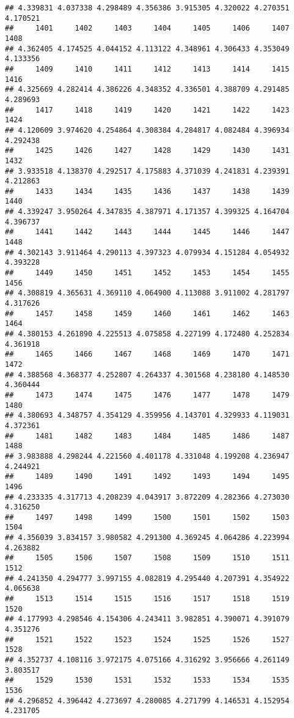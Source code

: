 \documentclass[
]{article}
\begin{document}
\begin{verbatim}
## 4.339831 4.037338 4.298489 4.356386 3.915305 4.320022 4.270351 4.170521 
##     1401     1402     1403     1404     1405     1406     1407     1408 
## 4.362405 4.174525 4.044152 4.113122 4.348961 4.306433 4.353049 4.133356 
##     1409     1410     1411     1412     1413     1414     1415     1416 
## 4.325669 4.282414 4.386226 4.348352 4.336501 4.388709 4.291485 4.289693 
##     1417     1418     1419     1420     1421     1422     1423     1424 
## 4.120609 3.974620 4.254864 4.308384 4.284817 4.082484 4.396934 4.292438 
##     1425     1426     1427     1428     1429     1430     1431     1432 
## 3.933518 4.138370 4.292517 4.175883 4.371039 4.241831 4.239391 4.212863 
##     1433     1434     1435     1436     1437     1438     1439     1440 
## 4.339247 3.950264 4.347835 4.387971 4.171357 4.399325 4.164704 4.396737 
##     1441     1442     1443     1444     1445     1446     1447     1448 
## 4.302143 3.911464 4.290113 4.397323 4.079934 4.151284 4.054932 4.393228 
##     1449     1450     1451     1452     1453     1454     1455     1456 
## 4.308819 4.365631 4.369110 4.064900 4.113088 3.911002 4.281797 4.317626 
##     1457     1458     1459     1460     1461     1462     1463     1464 
## 4.380153 4.261890 4.225513 4.075858 4.227199 4.172480 4.252834 4.361918 
##     1465     1466     1467     1468     1469     1470     1471     1472 
## 4.388568 4.368377 4.252807 4.264337 4.301568 4.238180 4.148530 4.360444 
##     1473     1474     1475     1476     1477     1478     1479     1480 
## 4.380693 4.348757 4.354129 4.359956 4.143701 4.329933 4.119031 4.372361 
##     1481     1482     1483     1484     1485     1486     1487     1488 
## 3.983888 4.298244 4.221560 4.401178 4.331048 4.199208 4.236947 4.244921 
##     1489     1490     1491     1492     1493     1494     1495     1496 
## 4.233335 4.317713 4.208239 4.043917 3.872209 4.282366 4.273030 4.316250 
##     1497     1498     1499     1500     1501     1502     1503     1504 
## 4.356039 3.834157 3.980582 4.291300 4.369245 4.064286 4.223994 4.263882 
##     1505     1506     1507     1508     1509     1510     1511     1512 
## 4.241350 4.294777 3.997155 4.082819 4.295440 4.207391 4.354922 4.065638 
##     1513     1514     1515     1516     1517     1518     1519     1520 
## 4.177993 4.298546 4.154306 4.243411 3.982851 4.390071 4.391079 4.351276 
##     1521     1522     1523     1524     1525     1526     1527     1528 
## 4.352737 4.108116 3.972175 4.075166 4.316292 3.956666 4.261149 3.803517 
##     1529     1530     1531     1532     1533     1534     1535     1536 
## 4.296852 4.396442 4.273697 4.280085 4.271799 4.146531 4.152954 4.231705 

\end{verbatim}
\end{document}
